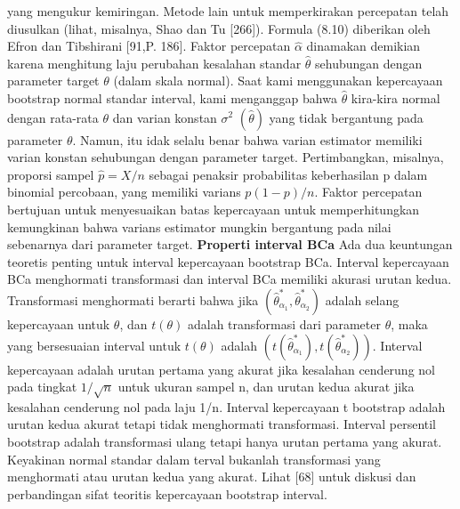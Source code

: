 \documentclass[a4paper,12pt]{article}
\theoremstyle{definition}
\begin{document}
yang mengukur kemiringan.
Metode lain untuk memperkirakan percepatan telah diusulkan (lihat, misalnya, Shao dan Tu [266]). Formula (8.10) diberikan oleh Efron dan Tibshirani [91,P. 186]. Faktor percepatan $\widehat{\alpha }$ dinamakan demikian karena menghitung laju perubahan kesalahan standar $\widehat{\theta }$ sehubungan dengan parameter target $\theta$ (dalam skala normal). Saat kami menggunakan kepercayaan bootstrap normal standar
interval, kami menganggap bahwa $\widehat{\theta}$ kira-kira normal dengan rata-rata  $\theta$ dan varian konstan $\sigma ^{2}$ $\left ( \widehat{\theta } \right )$ yang tidak bergantung pada parameter $\theta$. Namun, itu idak selalu benar bahwa varian estimator memiliki varian konstan sehubungan dengan parameter target. Pertimbangkan, misalnya, proporsi sampel $\widehat{p}=X/n$ sebagai penaksir probabilitas keberhasilan p dalam binomial percobaan, yang memiliki varians $p(1-p)/n$. Faktor percepatan bertujuan untuk menyesuaikan batas kepercayaan untuk memperhitungkan kemungkinan bahwa varians estimator mungkin bergantung pada nilai sebenarnya dari parameter target.
\textbf{Properti interval BCa}
Ada dua keuntungan teoretis penting untuk interval kepercayaan bootstrap BCa. Interval kepercayaan BCa menghormati transformasi dan interval BCa memiliki akurasi urutan kedua. Transformasi menghormati berarti bahwa jika $(\widehat{\theta } _{\alpha _{1}}^{*},\widehat{\theta } _{\alpha _{2}}^{*})$ adalah selang kepercayaan untuk $\theta $, dan $t(\theta )$ adalah transformasi dari parameter $\theta$, maka yang bersesuaian interval untuk $t(\theta )$ adalah $(t(\widehat{\theta }_{\alpha _{1}}^{*}),t(\widehat{\theta }_{\alpha _{2}}^{*}))$. Interval kepercayaan adalah urutan pertama yang akurat jika kesalahan cenderung nol pada tingkat $1/\sqrt{n}$ untuk ukuran sampel n, dan urutan kedua
akurat jika kesalahan cenderung nol pada laju 1/n. Interval kepercayaan t bootstrap adalah urutan kedua akurat tetapi tidak menghormati transformasi. Interval persentil bootstrap adalah transformasi ulang tetapi hanya urutan pertama yang akurat. Keyakinan normal standar dalam terval bukanlah transformasi yang menghormati atau urutan kedua yang akurat. Lihat [68] untuk diskusi dan perbandingan sifat teoritis kepercayaan bootstrap interval.
\end{document}
